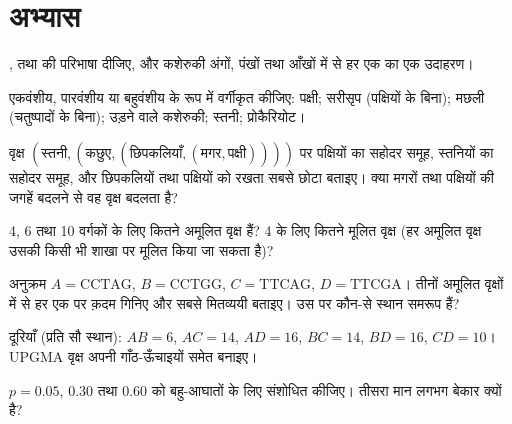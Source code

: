 \section{अभ्यास}

\begin{exercise}[$\star$]\label{exo:b2:phylogenetic-trees:1}
,  तथा  की परिभाषा दीजिए, और
कशेरुकी अंगों, पंखों तथा आँखों में से हर एक का एक उदाहरण।
\end{exercise}

\begin{exercise}[$\star$]\label{exo:b2:phylogenetic-trees:2}
एकवंशीय, पारवंशीय या बहुवंशीय के रूप में वर्गीकृत कीजिए: पक्षी;
सरीसृप (पक्षियों के बिना); मछली (चतुष्पादों के बिना); उड़ने वाले
कशेरुकी; स्तनी; प्रोकैरियोट।
\end{exercise}

\begin{exercise}[$\star$]\label{exo:b2:phylogenetic-trees:3}
वृक्ष $(\text{स्तनी},(\text{कछुए},(\text{छिपकलियाँ},
(\text{मगर},\text{पक्षी}))))$ पर पक्षियों का सहोदर समूह,
स्तनियों का सहोदर समूह, और छिपकलियों तथा पक्षियों को रखता
सबसे छोटा  बताइए। क्या मगरों तथा पक्षियों की जगहें
बदलने से वह वृक्ष बदलता है?
\end{exercise}

\begin{exercise}[$\star$]\label{exo:b2:phylogenetic-trees:4}
4, 6 तथा 10 वर्गकों के लिए कितने अमूलित वृक्ष हैं? 4 के लिए कितने
मूलित वृक्ष (हर अमूलित वृक्ष उसकी किसी भी शाखा पर मूलित किया जा
सकता है)?
\end{exercise}

\begin{exercise}[$\star\star$]\label{exo:b2:phylogenetic-trees:5}
अनुक्रम $A = \mathrm{CCTAG}$, $B = \mathrm{CCTGG}$, $C =
\mathrm{TTCAG}$, $D = \mathrm{TTCGA}$। तीनों अमूलित वृक्षों में से हर एक पर
क़दम गिनिए और सबसे मितव्ययी बताइए। उस पर कौन-से
स्थान समरूप हैं?
\end{exercise}

\begin{exercise}[$\star\star$]\label{exo:b2:phylogenetic-trees:6}
दूरियाँ (प्रति सौ स्थान): $AB = 6$, $AC = 14$, $AD = 16$,
$BC = 14$, $BD = 16$, $CD = 10$। UPGMA वृक्ष अपनी
गाँठ-ऊँचाइयों समेत बनाइए।
\end{exercise}

\begin{exercise}[$\star\star$]\label{exo:b2:phylogenetic-trees:7}
$p = 0.05$, $0.30$ तथा $0.60$ को बहु-आघातों के लिए संशोधित कीजिए। तीसरा
मान लगभग बेकार क्यों है?
\end{exercise}

